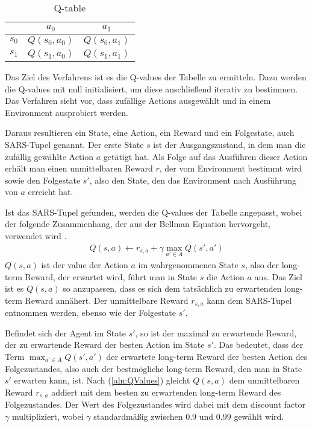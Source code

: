 \documentclass[11pt]{scrartcl}
\begin{document}
\begin{table}[ht]
  \begin{center}
    \begin{tabular}{c | c | c}
       & $a_0$ & $a_1$ \\
      \hline
      $s_0$ & $Q(s_0, a_0)$ &$ Q(s_0, a_1)$ \\
      \hline
      $s_1$ & $Q(s_1, a_0)$ & $Q(s_1, a_1)$ \\
    \end{tabular}

    \caption[Q-table]{Q-table}
    \label{tab:q_table}
  \end{center}
\end{table}

\noindent
Das Ziel des Verfahrens ist es die Q-values der Tabelle zu ermitteln. Dazu werden die
Q-values mit null initialisiert, um diese anschließend iterativ zu bestimmen. Das Verfahren
sieht vor, dass zufällige Actions ausgewählt und in einem Environment ausprobiert werden.

Daraus resultieren ein State, eine Action, ein Reward und ein Folgestate, auch SARS-Tupel
genannt. Der erste State $s$ ist der Ausgangszustand, in dem man die zufällig gewählte
Action $a$ getätigt hat. Als Folge auf das Ausführen dieser Action erhält man einen
unmittelbaren Reward $r$, der vom Environment bestimmt wird sowie den Folgestate $s'$,
also den State, den das Environment nach Ausführung von $a$ erreicht hat.

Ist das SARS-Tupel gefunden, werden die Q-values der Tabelle angepasst, wobei der folgende
Zusammenhang, der aus der Bellman Equation hervorgeht, verwendet wird
\cite[~S.193 ff.]{L2018}.
\begin{align}
  Q(s, a) \leftarrow r_{s,a} + \gamma \max_{a' \in A}Q(s', a')
  \label{aln:QValues}
\end{align}
\noindent
$Q(s, a)$ ist der value der Action $a$ im wahrgenommenen State $s$, also der long-term
Reward, der erwartet wird, führt man in State $s$ die Action $a$ aus. Das Ziel ist es
$Q(s, a)$ so anzupassen, dass es sich dem tatsächlich zu erwartenden long-term Reward
annähert. Der unmittelbare Reward $r_{s,a}$ kann dem SARS-Tupel entnommen werden, ebenso
wie der Folgestate $s'$.

Befindet sich der Agent im State $s'$, so ist der maximal zu erwartende Reward, der 
zu erwartende Reward der besten Action im State $s'$. Das bedeutet, dass der Term
$\max_{a'\in A} Q(s', a')$ der erwartete long-term Reward der besten Action des
Folgezustandes, also auch der bestmögliche long-term Reward, den man in State $s'$
erwarten kann, ist. Nach (\ref{aln:QValues}) gleicht $Q(s, a)$ dem unmittelbaren Reward
$r_{s,a}$ addiert mit dem besten zu erwartenden long-term Reward des Folgezustandes. Der
Wert des Folgezustandes wird dabei mit dem discount factor $\gamma$ multipliziert, wobei 
$\gamma$ standardmäßig zwischen $0.9$ und $0.99$ gewählt wird.
\end{document}

